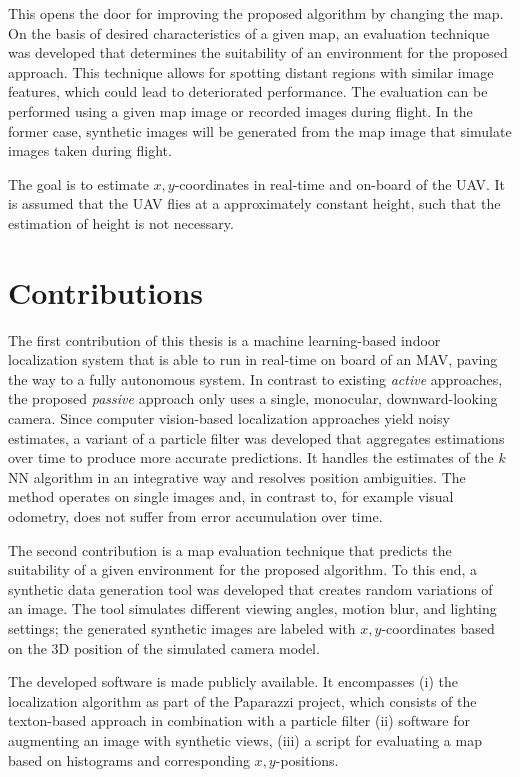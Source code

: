 This opens the door for improving the proposed
algorithm by changing the map. On the basis of desired characteristics
of a given map, an evaluation technique was developed that determines
the suitability of an environment for the proposed approach. This
technique allows for spotting distant regions with similar image
features, which could lead to deteriorated performance. The evaluation
can be performed using a given map image or recorded images during
flight. In the former case, synthetic images will be generated from
the map image that simulate images taken during flight.

The goal is to estimate $x,y$-coordinates in real-time and on-board of the UAV. It is assumed that the UAV flies at a approximately constant height, such that the estimation of height is not necessary.


\section{Contributions}
\label{sec:contributions}

The first contribution of this thesis is a machine learning-based
indoor localization system that is able to run in real-time on board
of an MAV, paving the way to a fully autonomous system. In contrast to
existing \emph{active} approaches, the proposed \emph{passive}
approach only uses a single, monocular, downward-looking camera. Since
computer vision-based localization approaches yield noisy estimates, a
variant of a particle filter was developed that aggregates estimations
over time to produce more accurate predictions. It handles the
estimates of the $k$NN algorithm in an integrative way and resolves
position ambiguities. The method operates on single images and, in
contrast to, for example visual odometry, does not suffer from error
accumulation over time.

The second contribution is a map evaluation technique that predicts
the suitability of a given environment for the proposed algorithm. To
this end, a synthetic data generation tool was developed that creates
random variations of an image. The tool simulates different viewing
angles, motion blur, and lighting settings; the generated synthetic
images are labeled with $x,y$-coordinates based on the 3D position of
the simulated camera model.

The developed software is made publicly available. It encompasses (i)
the localization algorithm as part of the Paparazzi project, which
consists of the texton-based approach in combination with a particle
filter (ii) software for augmenting an image with synthetic views,
(iii) a script for evaluating a map based on histograms and
corresponding $x,y$-positions.


